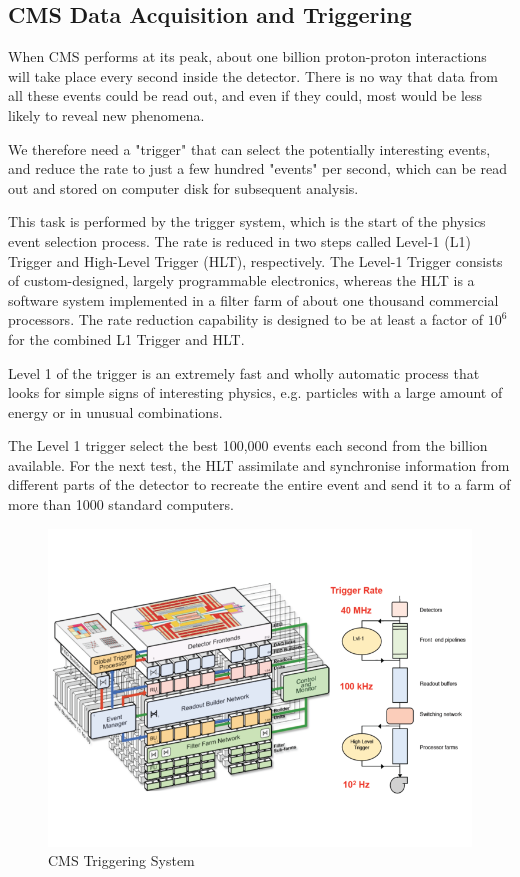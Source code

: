 \subsection{CMS Data Acquisition and Triggering}\label{triggerbase}

When CMS performs at its peak, about one billion proton-proton interactions will take place every second inside the detector. There is no way that data from all these events could be read out, and even if they could, most would be less likely to reveal new phenomena.

We therefore need a "trigger" \cite{TRIGGER1,TRIGGER2} that can select the potentially interesting events, and reduce the rate to just a few hundred "events" per second, which can be read out and stored on computer disk for subsequent analysis.

This task is performed by the trigger system, which is the start of the physics event selection process. The rate is reduced in two steps called Level-1 (L1) Trigger and High-Level Trigger (HLT), respectively. The Level-1 Trigger consists of custom-designed, largely programmable electronics, whereas the HLT is a software
system implemented in a filter farm of about one thousand commercial processors. The rate reduction capability is designed to be at least a factor of $10^{6}$ for the combined L1 Trigger and HLT. 

Level 1 of the trigger is an extremely fast and wholly automatic process that looks for simple signs of interesting physics, e.g. particles with a large amount of energy or in unusual combinations.

The Level 1 trigger select the best 100,000 events each second from the billion available. For the next test, the HLT assimilate and synchronise information from different parts of the detector to recreate the entire event and send it to a farm of more than 1000 standard computers.

\begin{figure}[H]
  \centering
\includegraphics[width=14cm]{CMS_chapter_plots/TRIGGER}
  \caption{CMS Triggering System \label{fig:TRIGGER}}
\end{figure}

